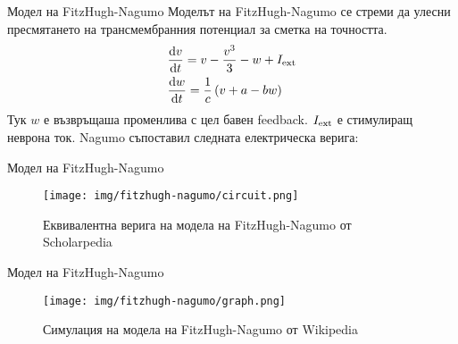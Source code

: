 \begin{frame}[t]{Модел на FitzHugh-Nagumo}
  Моделът на FitzHugh-Nagumo се стреми да улесни пресмятането на трансмембранния потенциал за сметка на точността.
  \begin{align*}
    &\dv{v}{t} = v - \frac{v^{3}}{3} - w + I_{\rm{ext}} \\
    &\dv{w}{t} = \frac{1}{c}\left(v + a - bw\right)
  \end{align*}
  Тук $w$ е възвръщаша променлива с цел бавен feedback.
  $I_{\rm{ext}}$ е стимулиращ неврона ток.
  Nagumo съпоставил следната електрическа верига:
\end{frame}

\begin{frame}[t]{Модел на FitzHugh-Nagumo}
  \begin{figure}[htbp!]
    \centering
    \texttt{[image: img/fitzhugh-nagumo/circuit.png]}
    \caption{Еквивалентна верига на модела на FitzHugh-Nagumo от Scholarpedia}
  \end{figure}
\end{frame}

\begin{frame}[t]{Модел на FitzHugh-Nagumo}
  \begin{figure}[htbp!]
    \centering
    \texttt{[image: img/fitzhugh-nagumo/graph.png]}
    \caption{Симулация на модела на FitzHugh-Nagumo от Wikipedia}
  \end{figure}
\end{frame}
